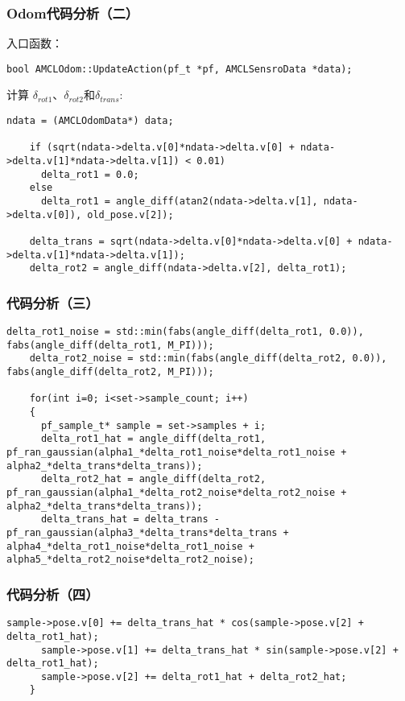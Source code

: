 \begin{frame}[fragile]
  \frametitle{Odom代码分析（二）}

  入口函数：

  \begin{lstlisting}[frame=shadowbox]
    bool AMCLOdom::UpdateAction(pf_t *pf, AMCLSensroData *data);
  \end{lstlisting}

  计算 $\delta_{rot1}$、$\delta _{rot2}$和$\delta _{trans}$:
  \begin{lstlisting}[frame=shadowbox]
    ndata = (AMCLOdomData*) data;

    if (sqrt(ndata->delta.v[0]*ndata->delta.v[0] + ndata->delta.v[1]*ndata->delta.v[1]) < 0.01) 
      delta_rot1 = 0.0;
    else
      delta_rot1 = angle_diff(atan2(ndata->delta.v[1], ndata->delta.v[0]), old_pose.v[2]);
      
    delta_trans = sqrt(ndata->delta.v[0]*ndata->delta.v[0] + ndata->delta.v[1]*ndata->delta.v[1]);
    delta_rot2 = angle_diff(ndata->delta.v[2], delta_rot1);
  \end{lstlisting}


\end{frame}


\begin{frame}[fragile]
  \frametitle{代码分析（三）}
  \begin{lstlisting}[frame=shadowbox]
    delta_rot1_noise = std::min(fabs(angle_diff(delta_rot1, 0.0)), fabs(angle_diff(delta_rot1, M_PI)));
    delta_rot2_noise = std::min(fabs(angle_diff(delta_rot2, 0.0)), fabs(angle_diff(delta_rot2, M_PI)));

    for(int i=0; i<set->sample_count; i++)
    {
      pf_sample_t* sample = set->samples + i;
      delta_rot1_hat = angle_diff(delta_rot1, pf_ran_gaussian(alpha1_*delta_rot1_noise*delta_rot1_noise + alpha2_*delta_trans*delta_trans));
      delta_rot2_hat = angle_diff(delta_rot2, pf_ran_gaussian(alpha1_*delta_rot2_noise*delta_rot2_noise + alpha2_*delta_trans*delta_trans));
      delta_trans_hat = delta_trans - pf_ran_gaussian(alpha3_*delta_trans*delta_trans + alpha4_*delta_rot1_noise*delta_rot1_noise + alpha5_*delta_rot2_noise*delta_rot2_noise);
  \end{lstlisting}
\end{frame}

\begin{frame}[fragile]
  \frametitle{代码分析（四）}
  \begin{lstlisting}[frame=shadowbox]
      sample->pose.v[0] += delta_trans_hat * cos(sample->pose.v[2] + delta_rot1_hat);  
      sample->pose.v[1] += delta_trans_hat * sin(sample->pose.v[2] + delta_rot1_hat);  
      sample->pose.v[2] += delta_rot1_hat + delta_rot2_hat;
    }
  \end{lstlisting}
\end{frame}